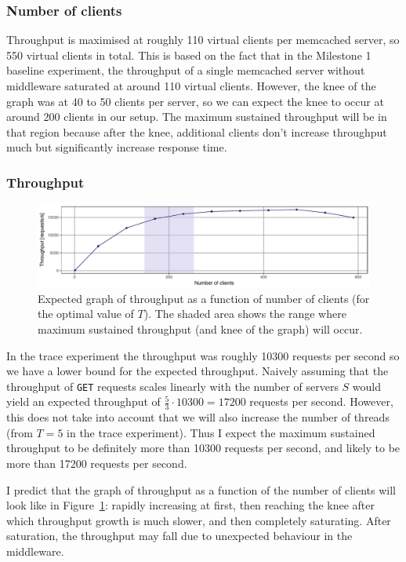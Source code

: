 \documentclass[11pt]{article}
\newcommand{\get}[0]{\texttt{GET}}
\begin{document}
\subsubsection{Number of clients}
Throughput is maximised at roughly 110 virtual clients per memcached server, so 550 virtual clients in total. This is based on the fact that in the Milestone 1 baseline experiment, the throughput of a single memcached server without middleware saturated at around 110 virtual clients. However, the knee of the graph was at 40 to 50 clients per server, so we can expect the knee to occur at around 200 clients in our setup. The maximum sustained throughput will be in that region because after the knee, additional clients don't increase throughput much but significantly increase response time.

\subsubsection{Throughput}

\begin{figure}[h]
\centering
\includegraphics[width=\textwidth]{figures/hypothesis_throughput.pdf}
\caption{Expected graph of throughput as a function of number of clients (for the optimal value of $T$). The shaded area shows the range where maximum sustained throughput (and knee of the graph) will occur.}
\label{fig:exp1:hyp:throughput}
\end{figure}

In the trace experiment the throughput was roughly 10300 requests per second so we have a lower bound for the expected throughput. Naively assuming that the throughput of \get{} requests scales linearly with the number of servers $S$ would yield an expected throughput of $\frac{5}{3} \cdot 10300 = 17200$ requests per second. However, this does not take into account that we will also increase the number of threads (from $T=5$ in the trace experiment). Thus I expect the maximum sustained throughput to be definitely more than 10300 requests per second, and likely to be more than 17200 requests per second.

I predict that the graph of throughput as a function of the number of clients will look like in Figure~\ref{fig:exp1:hyp:throughput}: rapidly increasing at first, then reaching the knee after which throughput growth is much slower, and then completely saturating. After saturation, the throughput may fall due to unexpected behaviour in the middleware.
\end{document}
